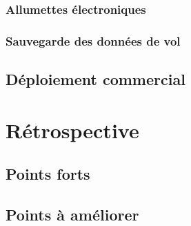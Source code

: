 \subsubsection{Allumettes électroniques}



\subsubsection{Sauvegarde des données de vol}



\subsection{Déploiement commercial}



\section{Rétrospective}

\subsection{Points forts}



\subsection{Points à améliorer}
